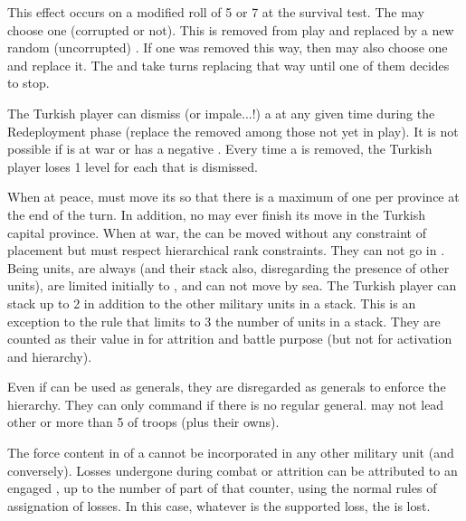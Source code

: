  This effect occurs on a modified roll
of 5 or 7 at the survival test.
\bparag The  may choose one
\Pasha (corrupted or not). This \Pasha is removed from play and
replaced by a new random (uncorrupted) \Pasha.
\bparag If one \Pasha was removed this way, then \TUR may also choose
one and replace it.
\bparag The  and \TUR take
turns replacing \Pashas that way until one of them decides to stop.

 The Turkish player can dismiss (or
impale...!) a \Pasha at any given time during the Redeployment phase
(replace the removed \Pasha among those not yet in play). It is not
possible if \TUR is at war or has a negative \STAB.  Every time a \Pasha
is removed, the Turkish player loses 1 \STAB level for each \Pasha that
is dismissed.

\bparag When at peace, \TUR must move its \Pashas so that there is a
maximum of one \Pasha per province at the end of the turn. In addition,
no \Pasha may ever finish its move in the Turkish capital province.
\bparag When at war, the \Pashas can be moved without any constraint of
placement but must respect hierarchical rank constraints. They can not
go in \ROTW.
\bparag Being \Timar units, \Pashas are always  (and
their stack also, disregarding the presence of other 
units), are limited initially to \TARQ, and can not move by sea.
 The Turkish player can stack up to 2
\Pashas in addition to the other military units in a stack. This is an
exception to the rule that limits to 3 the number of units in a
stack. They are counted as their value in \LD for attrition and battle
purpose (but not for activation and hierarchy).

 Even if \Pashas can be used as generals,
they are disregarded as generals to enforce the hierarchy. They can only
command if there is no regular general.
\bparag[] [BLP] \Pashas may not lead other \Pashas or more than 5\LD
of troops (plus their owns).

 The force content in \LD of a \Pasha cannot be
incorporated in any other military unit (and conversely).
\bparag Losses undergone during combat or attrition can be attributed to
an engaged \Pasha, up to the number of \LD part of that \Pasha counter,
using the normal rules of assignation of losses.  In this case, whatever
is the supported loss, the \Pasha is lost. %


